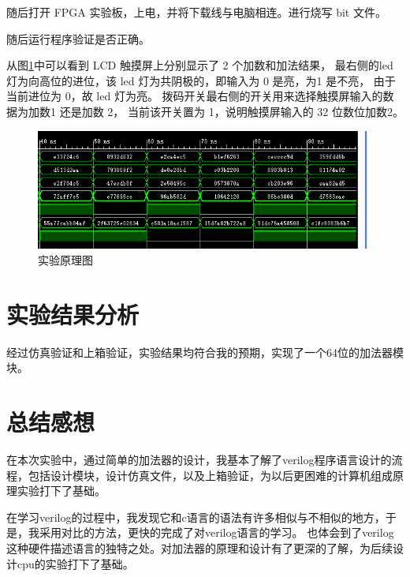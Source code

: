 \documentclass{ctexart}
\begin{document}
随后打开 FPGA 实验板，上电，并将下载线与电脑相连。进行烧写 bit 文件。

随后运行程序验证是否正确。

从图\ref{box}中可以看到 LCD 触摸屏上分别显示了 2 个加数和加法结果，
最右侧的led 灯为向高位的进位，该 led 灯为共阴极的，即输入为 0 是亮，为1 是不亮，
由于当前进位为 0，故 led 灯为亮。
拨码开关最右侧的开关用来选择触摸屏输入的数据为加数1 还是加数 2，
当前该开关置为 1，说明触摸屏输入的 32 位数位加数2。
\begin{figure}[ht]
    \centering
    \includegraphics[width=1\textwidth]{./figures/wave.png}
    \caption{实验原理图}
    \label{box}
\end{figure}
\section{实验结果分析}
经过仿真验证和上箱验证，实验结果均符合我的预期，实现了一个64位的加法器模块。
\section{总结感想}
在本次实验中，通过简单的加法器的设计，我基本了解了verilog程序语言设计的流程，包括设计模块，设计仿真文件，以及上箱验证，为以后更困难的计算机组成原理实验打下了基础。

在学习verilog的过程中，我发现它和c语言的语法有许多相似与不相似的地方，于是，我采用对比的方法，更快的完成了对verilog语言的学习。
也体会到了verilog这种硬件描述语言的独特之处。对加法器的原理和设计有了更深的了解，为后续设计cpu的实验打下了基础。
\end{document}
